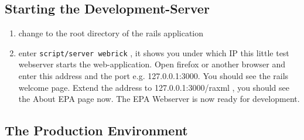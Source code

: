 \documentclass{scrartcl}
\begin{document}
		\subsection{Starting the Development-Server}
			\begin{enumerate}
			\item change to the root directory of the rails application
			\item enter \texttt{script/server webrick} , it shows you under which IP this little test webserver starts the web-application. Open firefox or another browser and enter this address and the port e.g. 127.0.0.1:3000. You should see the rails welcome page. Extend the address to 127.0.0.1:3000/raxml , you should see the About EPA page now. The EPA Webserver is now ready for development.
			\end{enumerate}
		\subsection{The Production Environment}
\end{document}
